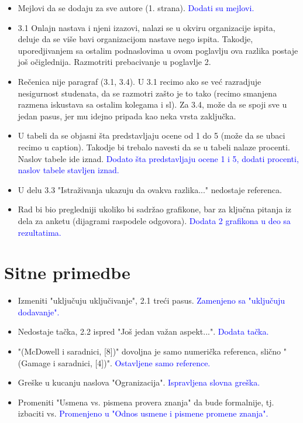 \documentclass[a4paper]{report}
\newcommand{\odgovor}[1]{\textcolor{blue}{#1}}
\begin{document}
\begin{itemize}
    \item Mejlovi da se dodaju za sve autore (1. strana).
    \odgovor{Dodati su mejlovi.}
    \item 3.1 Onlajn nastava i njeni izazovi, nalazi se u okviru organizacije ispita, deluje da se više bavi organizacijom nastave nego ispita. Takodje, uporedjivanjem sa ostalim podnaslovima u ovom poglavlju ova razlika postaje još očiglednija. Razmotriti prebacivanje u poglavlje 2.
    \item Rečenica nije paragraf (3.1, 3.4). U 3.1 recimo ako se već razradjuje nesigurnost studenata, da se razmotri zašto je to tako (recimo smanjena razmena iskustava sa ostalim kolegama i sl). Za 3.4, može da se spoji sve u jedan pasus, jer mu idejno pripada kao neka vrsta zaključka.
    \item U tabeli da se objasni šta predstavljaju ocene od 1 do 5 (može da se ubaci recimo u caption). Takodje bi trebalo navesti da se u tabeli nalaze procenti. Naslov tabele ide iznad.
    \odgovor{Dodato šta predstavljaju ocene 1 i 5, dodati procenti, naslov tabele stavljen iznad.}
    \item U delu 3.3 "Istraživanja ukazuju da ovakva razlika..."\hspace{0.1cm} nedostaje referenca.
    \item Rad bi bio pregledniji ukoliko bi sadržao grafikone, bar za ključna pitanja iz dela za anketu (dijagrami raspodele odgovora).
    \odgovor{Dodata 2 grafikona u deo sa rezultatima.}
\end{itemize}

\section{Sitne primedbe}


\begin{itemize}
    \item Izmeniti "uključuju uključivanje", 2.1 treći pasus.
    \odgovor{Zamenjeno sa "uključuju dodavanje".}
    \item Nedostaje tačka, 2.2 ispred "Još
    jedan važan aspekt...".
    \odgovor{Dodata tačka.}
    \item "(McDowell i saradnici, [8])"\hspace{0.1cm} dovoljna je samo numerička referenca, slično  "(Gamage i saradnici, [4])".
    \odgovor{Ostavljene samo reference.}
    \item Greške u kucanju naslova "Ogranizacija".
    \odgovor{Ispravljena slovna greška.}
    \item Promeniti "Usmena vs. pismena provera znanja"\hspace{0.1cm} da bude formalnije, tj. izbaciti vs.
    \odgovor{Promenjeno u "Odnos usmene i pismene promene znanja".}
\end{itemize}
\end{document}
